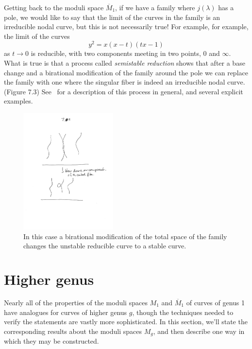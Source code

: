 Getting back to the moduli space $\overline M_1$, if we have a family where
$j(\lambda)$ has a pole, we would like to say that the limit of the curves in the family is an irreducible nodal curve,
but this is not necessarily true! For example, for example, the limit of the curves
$$
y^2 = x(x-t)(tx-1)
$$
as $t \to 0$ is reducible, with two components meeting in two points, 0 and $\infty$.
What is true is that a process called \emph{semistable reduction} shows that after a base change and a birational
modification of the family around the pole we can replace the family with one where the singular fiber
is indeed an irreducible nodal curve. (Figure 7.3) See~\cite{MR1631825} for a description of this process in general, and several explicit examples.

\begin{figure}\label{Fig7.3}
\begin{center}
\centerline {\includegraphics[height=2.5in]{"Fig7.1.pdf"}}
\caption{In this case a birational modification of the total space of the family changes the unstable reducible curve to a stable curve.}
\label{default}
\end{center}
\end{figure}

\section{Higher genus}

Nearly all of the properties of the moduli spaces $M_1$ and $\overline M_1$ of curves of genus 1 have analogues for curves of higher genus $g$,  though the techniques needed to verify the statements are vastly more sophisticated. In this section, we'll state the corresponding results about the moduli spaces $M_g$, and then describe one way in which they may be constructed.

